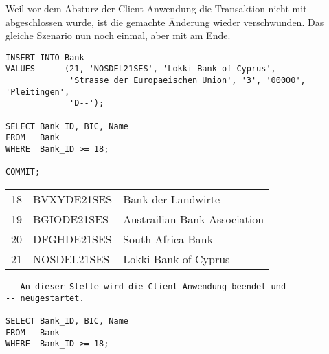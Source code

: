 Weil vor dem Absturz der Client-Anwendung die Transaktion nicht mit
\COMMIT{} abgeschlossen wurde, ist die gemachte Änderung wieder
verschwunden. Das gleiche Szenario nun noch einmal, aber mit \COMMIT{}
am Ende.
\begin{lstlisting}[language=oracle_sql,label=sql07_26]
INSERT INTO Bank
VALUES      (21, 'NOSDEL21SES', 'Lokki Bank of Cyprus',
             'Strasse der Europaeischen Union', '3', '00000', 'Pleitingen',
             'D--');

SELECT Bank_ID, BIC, Name
FROM   Bank
WHERE  Bank_ID >= 18;

COMMIT;
          \end{lstlisting}
\begin{center}
    \begin{small}
        \tablehead{}
        \tabletail {
        }
        \begin{msoraclesql}
            \begin{supertabular}{rll}
                18 & BVXYDE21SES & Bank der Landwirte \\
                19 & BGIODE21SES & Austrailian Bank Association \\
                20 & DFGHDE21SES & South Africa Bank \\
                21 & NOSDEL21SES & Lokki Bank of Cyprus  \\
            \end{supertabular}
        \end{msoraclesql}
    \end{small}
\end{center}
\begin{lstlisting}[language=oracle_sql,label=sql07_27]
-- An dieser Stelle wird die Client-Anwendung beendet und
-- neugestartet.

SELECT Bank_ID, BIC, Name
FROM   Bank
WHERE  Bank_ID >= 18;
          \end{lstlisting}
